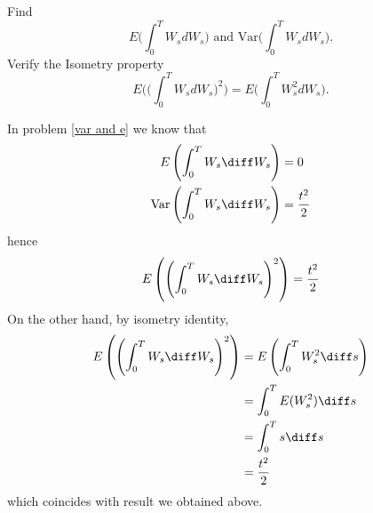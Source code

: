     \problem
    \begin{question}
        Find
        \[E\Big(\int_0^TW_sdW_s\Big)\text{~and~}\text{Var}\Big(\int_0^TW_sdW_s\Big).\]
        Verify the Isometry property 
        \[E\Big(\Big(\int_0^TW_sdW_s\Big)^2\Big)=E\Big(\int_0^TW^2_sdW_s\Big).\]
    \end{question}
    In problem \ref{var and e} we know that
    \[\begin{aligned}
        E\left(\int_0^TW_s\diff W_s\right)&=0\\
        \var\left(\int_0^TW_s\diff W_s\right)&=\frac{t^2}{2}
    \end{aligned}\]
    hence
    \[E\left(\left(\int_0^TW_s\diff W_s\right)^2\right)=\frac{t^2}{2}\]
    On the other hand, by isometry identity,
    \[\begin{aligned}
        E\left(\left(\int_0^TW_s\diff W_s\right)^2\right)
        &=E\left(\int_0^TW_s^2\diff s\right)\\
        &=\int_0^TE(W_s^2)\diff s\\
        &=\int_0^Ts\diff s\\
        &=\frac{t^2}{2}
    \end{aligned}\]
    which coincides with result we obtained above.

